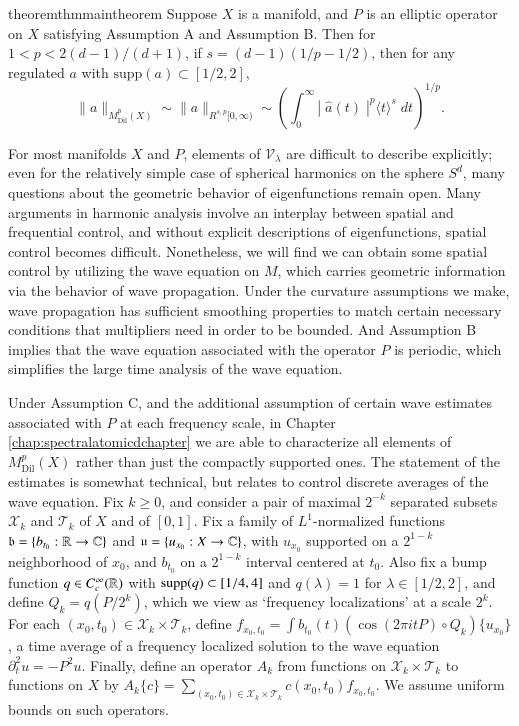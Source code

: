 \begin{restatable}{theorem}{thmmaintheorem} \label{maintheorem}
  Suppose $X$ is a manifold, and $P$ is an elliptic operator on $X$ satisfying Assumption A and Assumption B. Then for $1 < p < 2(d-1)/(d+1)$, if $s = (d-1)(1/p - 1/2)$, then for any regulated $a$ with $\text{supp}(a) \subset [1/2,2]$,
  \[ \| a \|_{M^p_{\text{Dil}}(X)} \sim \| a \|_{R^{s,p}[0,\infty)} \sim \left( \int_0^\infty |\;\!\widehat{a}(t)\;\!|^p \langle t \rangle^s\; dt \right)^{1/p}. \]
\end{restatable}

For most manifolds $X$ and $P$, elements of $\mathcal{V}_\lambda$ are difficult to describe explicitly; even for the relatively simple case of spherical harmonics on the sphere $S^d$, many questions about the geometric behavior of eigenfunctions remain open. Many arguments in harmonic analysis involve an interplay between spatial and frequential control, and without explicit descriptions of eigenfunctions, spatial control becomes difficult. Nonetheless, we will find we can obtain some spatial control by utilizing the wave equation on $M$, which carries geometric information via the behavior of wave propagation. Under the curvature assumptions we make, wave propagation has sufficient smoothing properties to match certain necessary conditions that multipliers need in order to be bounded. And Assumption B implies that the wave equation associated with the operator $P$ is periodic, which simplifies the large time analysis of the wave equation.

Under Assumption C, and the additional assumption of certain wave estimates associated with $P$ at each frequency scale, in Chapter \ref{chap:spectralatomicdchapter} we are able to characterize all elements of $M^p_{\text{Dil}}(X)$ rather than just the compactly supported ones. The statement of the estimates is somewhat technical, but relates to control discrete averages of the wave equation. Fix $k \geq 0$, and consider a pair of maximal $2^{-k}$ separated subsets $\mathcal{X}_k$ and $\mathcal{T}_k$ of $X$ and of $[0,1]$. Fix a family of $L^1$-normalized functions $\mathfrak{b} = \{ b_{t_0}: \operatorname{\mathbb{R}} \to \operatorname{\mathbb{C}} \}$ and $\mathfrak{u} = \{ u_{x_0}: X \to \operatorname{\mathbb{C}} \}$, with $u_{x_0}$ supported on a $2^{1-k}$ neighborhood of $x_0$, and $b_{t_0}$ on a $2^{1-k}$ interval centered at $t_0$. Also fix a bump function $q \in C_c^\infty(\operatorname{\mathbb{R}})$ with $\operatorname{\text{supp}}(q) \subset [1/4,4]$ and $q(\lambda) = 1$ for $\lambda \in [1/2,2]$, and define $Q_k = q(P/2^k)$, which we view as `frequency localizations' at a scale $2^k$. For each $(x_0,t_0) \in \mathcal{X}_k \times \mathcal{T}_k$, define $f_{x_0,t_0} = \int b_{t_0}(t) (\cos(2 \pi i t P) \circ Q_k) \{ u_{x_0} \}$, a time average of a frequency localized solution to the wave equation $\partial_t^2 u = - P^2 u$. Finally, define an operator $A_k$ from functions on $\mathcal{X}_k \times \mathcal{T}_k$ to functions on $X$ by $A_k \{ c \} = \sum\nolimits_{(x_0,t_0) \in \mathcal{X}_k \times \mathcal{T}_k} c(x_0,t_0) f_{x_0,t_0}$. We assume uniform bounds on such operators.

